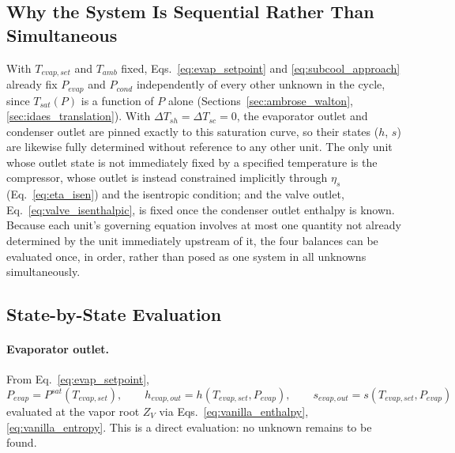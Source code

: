\documentclass{article}
\begin{document}
\subsection{Why the System Is Sequential Rather Than Simultaneous}\label{sec:why_sequential}

With $T_{evap,set}$ and $T_{amb}$ fixed, Eqs.~\eqref{eq:evap_setpoint} and
\eqref{eq:subcool_approach} already fix $P_{evap}$ and $P_{cond}$
independently of every other unknown in the cycle, since $T_{sat}(P)$ is a
function of $P$ alone (Sections~\ref{sec:ambrose_walton},
\ref{sec:idaes_translation}). With $\Delta T_{sh}=\Delta T_{sc}=0$, the
evaporator outlet and condenser outlet are pinned exactly to this
saturation curve, so their states ($h$, $s$) are likewise fully determined
without reference to any other unit. The only unit whose outlet state is
not immediately fixed by a specified temperature is the compressor, whose
outlet is instead constrained implicitly through $\eta_s$
(Eq.~\eqref{eq:eta_isen}) and the isentropic condition; and the valve
outlet, Eq.~\eqref{eq:valve_isenthalpic}, is fixed once the condenser
outlet enthalpy is known. Because each unit's governing equation involves
at most one quantity not already determined by the unit immediately
upstream of it, the four balances can be evaluated once, in order, rather
than posed as one system in all unknowns simultaneously.

\subsection{State-by-State Evaluation}\label{sec:state_by_state}

\paragraph{Evaporator outlet.} From Eq.~\eqref{eq:evap_setpoint},
\begin{equation}\label{eq:seq_evap_out}
    P_{evap} = P^{sat}(T_{evap,set}), \qquad
    h_{evap,out} = h(T_{evap,set}, P_{evap}), \qquad
    s_{evap,out} = s(T_{evap,set}, P_{evap})
\end{equation}
evaluated at the vapor root $Z_V$ via Eqs.~\eqref{eq:vanilla_enthalpy},
\eqref{eq:vanilla_entropy}. This is a direct evaluation: no unknown remains
to be found.
\end{document}
